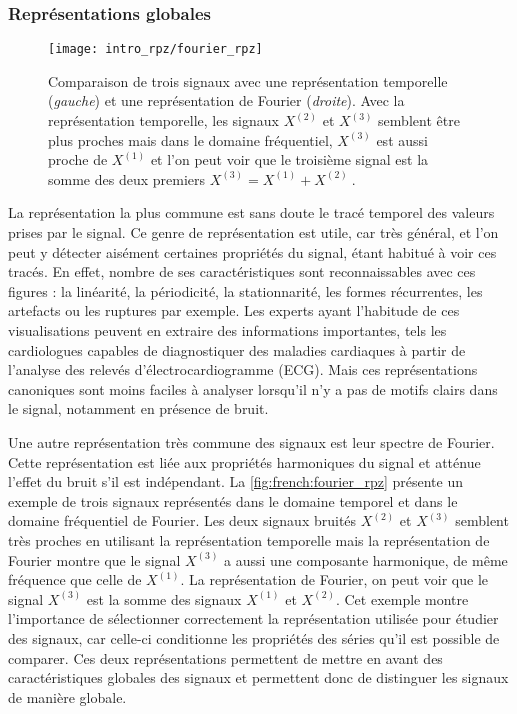 \documentclass[../thesis.tex]{subfiles}
\begin{document}
\subsubsection{Représentations globales}

\begin{figure}[tp]
	\centering
	\texttt{[image: intro\_rpz/fourier\_rpz]}
	\caption{Comparaison de trois signaux avec une représentation temporelle (\emph{gauche})
	et une représentation de Fourier (\emph{droite}). Avec la représentation temporelle,
	les signaux $X^{(2)}$ et $X^{(3)}$ semblent être plus proches mais dans le domaine
	fréquentiel, $X^{(3)}$ est aussi proche de $X^{(1)}$ et l'on peut voir que le
	troisième signal est la somme des deux premiers $X^{(3)} = X^{(1)} + X^{(2)}~.$}
	\label{fig:french:fourier_rpz}
\end{figure}

	La représentation la plus commune est sans doute le tracé temporel des
	valeurs prises par le signal. Ce genre de représentation est utile, car très
	général, et l'on peut y détecter aisément certaines propriétés du signal, étant habitué
	à voir ces tracés. En effet, nombre de ses caractéristiques sont reconnaissables avec
	ces figures : la linéarité, la périodicité, la stationnarité, les formes récurrentes,
	les artefacts ou les ruptures par exemple. Les experts ayant l'habitude de
	ces visualisations peuvent en extraire des informations importantes, tels les cardiologues
	capables de diagnostiquer des maladies cardiaques à partir de l'analyse des relevés
	d'électrocardiogramme (ECG). Mais ces représentations canoniques
	sont moins faciles à analyser lorsqu'il n'y a pas de motifs clairs dans le signal,
	notamment en présence de bruit.
	
	Une autre représentation très commune des signaux
	est leur spectre de Fourier. Cette représentation est liée aux propriétés harmoniques
	du signal et atténue l'effet du bruit s'il est indépendant. La \autoref{fig:french:fourier_rpz}
	présente un exemple de trois signaux représentés dans le domaine temporel et
	dans le domaine fréquentiel de Fourier. Les deux signaux bruités $X^{(2)}$ et $X^{(3)}$
	semblent très proches en utilisant la représentation temporelle mais la représentation
	de Fourier montre que le signal $X^{(3)}$ a aussi une composante harmonique, de même
	fréquence que celle de $X^{(1)}$. La représentation de Fourier, on peut
	voir que le signal $X^{(3)}$ est la somme des signaux $X^{(1)}$ et $X^{(2)}$. Cet
	exemple montre l'importance de sélectionner correctement la représentation utilisée
	pour étudier des signaux, car celle-ci conditionne les propriétés des séries qu'il
	est possible de comparer. Ces deux représentations permettent de mettre en avant
	des caractéristiques globales des signaux et permettent donc de distinguer les
	signaux de manière globale.
\end{document}

